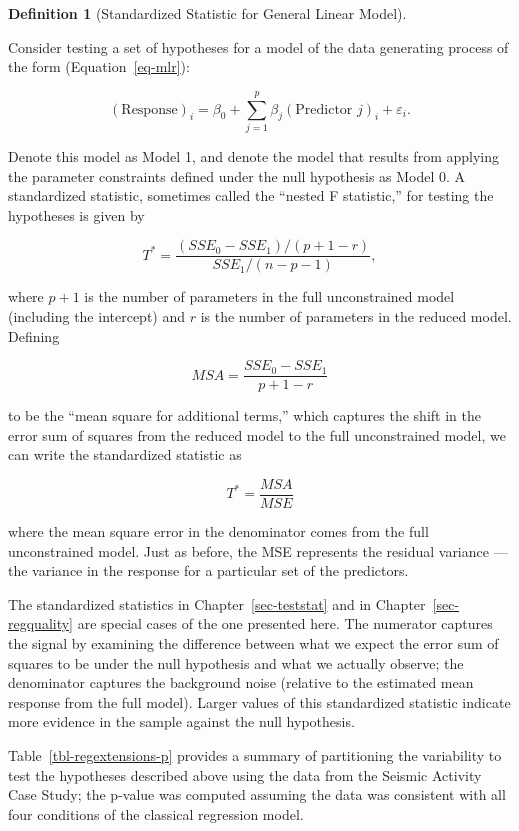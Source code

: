 \documentclass[
  letterpaper,
  DIV=11,
  numbers=noendperiod]{scrreprt}
\theoremstyle{definition}
\newtheorem{definition}{Definition}[chapter]
\theoremstyle{definition}
\theoremstyle{plain}
\theoremstyle{remark}
\begin{document}
\begin{definition}[Standardized Statistic for General Linear
Model]\protect\hypertarget{def-general-f}{}\label{def-general-f}

Consider testing a set of hypotheses for a model of the data generating
process of the form (Equation~\ref{eq-mlr}):

\[(\text{Response})_i = \beta_0 + \sum_{j=1}^{p} \beta_j(\text{Predictor } j)_i + \varepsilon_i.\]

Denote this model as Model 1, and denote the model that results from
applying the parameter constraints defined under the null hypothesis as
Model 0. A standardized statistic, sometimes called the ``nested F
statistic,'' for testing the hypotheses is given by

\[T^* = \frac{\left(SSE_0 - SSE_1\right) / (p + 1 - r)}{SSE_1 / (n - p - 1)},\]

where \(p + 1\) is the number of parameters in the full unconstrained
model (including the intercept) and \(r\) is the number of parameters in
the reduced model. Defining

\[MSA = \frac{SSE_0 - SSE_1}{p + 1 - r}\]

to be the ``mean square for additional terms,'' which captures the shift
in the error sum of squares from the reduced model to the full
unconstrained model, we can write the standardized statistic as

\[T^* = \frac{MSA}{MSE}\]

where the mean square error in the denominator comes from the full
unconstrained model. Just as before, the MSE represents the residual
variance --- the variance in the response for a particular set of the
predictors.

\end{definition}

The standardized statistics in Chapter~\ref{sec-teststat} and in
Chapter~\ref{sec-regquality} are special cases of the one presented
here. The numerator captures the signal by examining the difference
between what we expect the error sum of squares to be under the null
hypothesis and what we actually observe; the denominator captures the
background noise (relative to the estimated mean response from the full
model). Larger values of this standardized statistic indicate more
evidence in the sample against the null hypothesis.

Table~\ref{tbl-regextensions-p} provides a summary of partitioning the
variability to test the hypotheses described above using the data from
the Seismic Activity Case Study; the p-value was computed assuming the
data was consistent with all four conditions of the classical regression
model.
\end{document}
